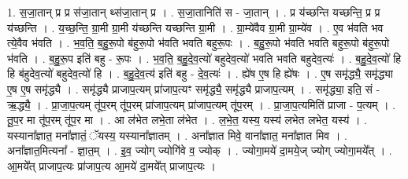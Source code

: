 \documentclass[17pt]{extarticle}
\begin{document}
1. स॒जा॒तान् प्र प्र स॑जा॒तान् थ्स॑जा॒तान् प्र । . स॒जा॒तानिति॑ स - जा॒तान् । . प्र य॑च्छन्ति यच्छन्ति॒ प्र प्र य॑च्छन्ति । . य॒च्छ॒न्ति॒ ग्रा॒मी ग्रा॒मी य॑च्छन्ति यच्छन्ति ग्रा॒मी । . ग्रा॒म्ये॑वैव ग्रा॒मी ग्रा॒म्ये॑व । . ए॒व भ॑वति भव त्ये॒वैव भ॑वति । . भ॒व॒ति॒ ब॒हु॒रू॒पो ब॑हुरू॒पो भ॑वति भवति बहुरू॒पः । . ब॒हु॒रू॒पो भ॑वति भवति बहुरू॒पो ब॑हुरू॒पो भ॑वति । . ब॒हु॒रू॒प इति॑ बहु - रू॒पः । . भ॒व॒ति॒ ब॒हु॒दे॒व॒त्यो॑ बहुदेव॒त्यो॑ भवति भवति बहुदेव॒त्यः॑ । . ब॒हु॒दे॒व॒त्यो॑ हि हि ब॑हुदेव॒त्यो॑ बहुदेव॒त्यो॑ हि । . ब॒हु॒दे॒व॒त्य॑ इति॑ बहु - दे॒व॒त्यः॑ । . ह्ये॑ष ए॒ष हि ह्ये॑षः । . ए॒ष समृ॑द्ध्यै॒ समृ॑द्ध्या ए॒ष ए॒ष समृ॑द्ध्यै । . समृ॑द्ध्यै प्राजाप॒त्यम् प्रा॑जाप॒त्यꣳ समृ॑द्ध्यै॒ समृ॑द्ध्यै प्राजाप॒त्यम् । . समृ॑द्ध्या॒ इति॒ सं - ऋ॒द्ध्यै॒ । . प्रा॒जा॒प॒त्यम् तू॑प॒रम् तू॑प॒रम् प्रा॑जाप॒त्यम् प्रा॑जाप॒त्यम् तू॑प॒रम् । . प्रा॒जा॒प॒त्यमिति॑ प्राजा - प॒त्यम् । . तू॒प॒र मा तू॑प॒रम् तू॑प॒र मा । . आ ल॑भेत लभे॒ता ल॑भेत । . ल॒भे॒त॒ यस्य॒ यस्य॑ लभेत लभेत॒ यस्य॑ । . यस्याना᳚ज्ञात॒ मना᳚ज्ञातं॒ ॅयस्य॒ यस्याना᳚ज्ञातम् । . अना᳚ज्ञात मिवे॒ वाना᳚ज्ञात॒ मना᳚ज्ञात मिव । . अना᳚ज्ञात॒मित्यना᳚ - ज्ञा॒त॒म् । . इ॒व॒ ज्योग् ज्योगि॑वे व॒ ज्योक् । . ज्योगा॒मये॑ दा॒मये॒ज् ज्योग् ज्योगा॒मये᳚त् । . आ॒मये᳚त् प्राजाप॒त्यः प्रा॑जाप॒त्य आ॒मये॑ दा॒मये᳚त् प्राजाप॒त्यः । \newline
\end{document}

